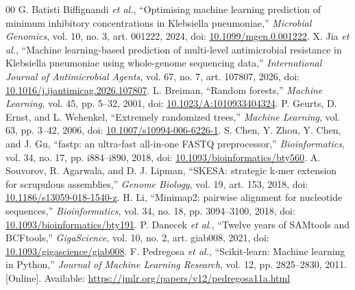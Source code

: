 \documentclass[conference]{IEEEtran}
\begin{document}
\begin{thebibliography}{00}
 G. Batisti Biffignandi \textit{et al.}, ``Optimising machine learning prediction of minimum inhibitory concentrations in Klebsiella pneumoniae,'' \textit{Microbial Genomics}, vol. 10, no. 3, art. 001222, 2024, doi: \href{https://doi.org/10.1099/mgen.0.001222}{10.1099/mgen.0.001222}.
 X. Jia \textit{et al.}, ``Machine learning-based prediction of multi-level antimicrobial resistance in Klebsiella pneumoniae using whole-genome sequencing data,'' \textit{International Journal of Antimicrobial Agents}, vol. 67, no. 7, art. 107807, 2026, doi: \href{https://doi.org/10.1016/j.ijantimicag.2026.107807}{10.1016/j.ijantimicag.2026.107807}.
 L. Breiman, ``Random forests,'' \textit{Machine Learning}, vol. 45, pp. 5--32, 2001, doi: \href{https://doi.org/10.1023/A:1010933404324}{10.1023/A:1010933404324}.
 P. Geurts, D. Ernst, and L. Wehenkel, ``Extremely randomized trees,'' \textit{Machine Learning}, vol. 63, pp. 3--42, 2006, doi: \href{https://doi.org/10.1007/s10994-006-6226-1}{10.1007/s10994-006-6226-1}.
 S. Chen, Y. Zhou, Y. Chen, and J. Gu, ``fastp: an ultra-fast all-in-one FASTQ preprocessor,'' \textit{Bioinformatics}, vol. 34, no. 17, pp. i884--i890, 2018, doi: \href{https://doi.org/10.1093/bioinformatics/bty560}{10.1093/bioinformatics/bty560}.
 A. Souvorov, R. Agarwala, and D. J. Lipman, ``SKESA: strategic k-mer extension for scrupulous assemblies,'' \textit{Genome Biology}, vol. 19, art. 153, 2018, doi: \href{https://doi.org/10.1186/s13059-018-1540-z}{10.1186/s13059-018-1540-z}.
 H. Li, ``Minimap2: pairwise alignment for nucleotide sequences,'' \textit{Bioinformatics}, vol. 34, no. 18, pp. 3094--3100, 2018, doi: \href{https://doi.org/10.1093/bioinformatics/bty191}{10.1093/bioinformatics/bty191}.
 P. Danecek \textit{et al.}, ``Twelve years of SAMtools and BCFtools,'' \textit{GigaScience}, vol. 10, no. 2, art. giab008, 2021, doi: \href{https://doi.org/10.1093/gigascience/giab008}{10.1093/gigascience/giab008}.
 F. Pedregosa \textit{et al.}, ``Scikit-learn: Machine learning in Python,'' \textit{Journal of Machine Learning Research}, vol. 12, pp. 2825--2830, 2011. [Online]. Available: \url{https://jmlr.org/papers/v12/pedregosa11a.html}
\end{thebibliography}
\end{document}
